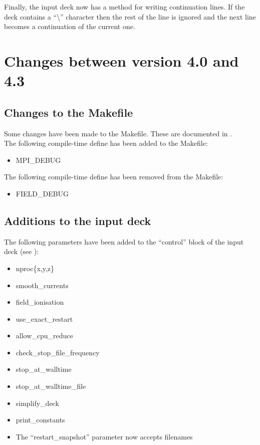 Finally, the input deck now has a method for writing continuation lines.
If the deck contains a ``\textbackslash'' character then the rest of the line
is ignored and the next line becomes a continuation of the current one.


\section{Changes between version 4.0 and 4.3}

\subsection{Changes to the Makefile}

Some changes have been made to the Makefile. These are documented in
.\\

\noindent The following compile-time define has been added to the Makefile:
\begin{itemize}
\item MPI\_DEBUG
\end{itemize}
\bigskip

\noindent The following compile-time define has been removed from the Makefile:
\begin{itemize}
\item FIELD\_DEBUG
\end{itemize}


\subsection{Additions to the input deck}
The following parameters have been added to the ``control'' block of
the input deck (see ):
\begin{itemize}
\item nproc\{x,y,z\}
\item smooth\_currents
\item field\_ionisation
\item use\_exact\_restart
\item allow\_cpu\_reduce
\item check\_stop\_file\_frequency
\item stop\_at\_walltime
\item stop\_at\_walltime\_file
\item simplify\_deck
\item print\_constants
\item The ``restart\_snapshot'' parameter now accepts filenames
\end{itemize}
\bigskip

